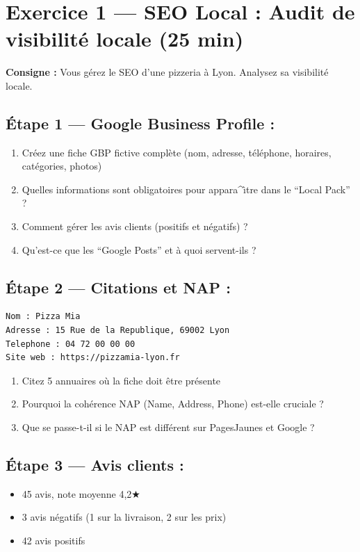 \documentclass[12pt,a4paper]{report}
\begin{document}
\section{Exercice 1 --- SEO Local : Audit de visibilit\'{e} locale (25 min)}

\textbf{Consigne :} Vous g\'{e}rez le SEO d'une pizzeria \`{a} Lyon. Analysez sa visibilit\'{e} locale.

\subsection*{\'{E}tape 1 --- Google Business Profile :}
\begin{enumerate}
    \item Cr\'{e}ez une fiche GBP fictive compl\`{e}te (nom, adresse, t\'{e}l\'{e}phone, horaires, cat\'{e}gories, photos)
    \item Quelles informations sont obligatoires pour appara^{\^\i}tre dans le ``Local Pack'' ?
    \item Comment g\'{e}rer les avis clients (positifs et n\'{e}gatifs) ?
    \item Qu'est-ce que les ``Google Posts'' et \`{a} quoi servent-ils ?
\end{enumerate}

\subsection*{\'{E}tape 2 --- Citations et NAP :}
\begin{lstlisting}
Nom : Pizza Mia
Adresse : 15 Rue de la Republique, 69002 Lyon
Telephone : 04 72 00 00 00
Site web : https://pizzamia-lyon.fr
\end{lstlisting}

\begin{enumerate}
    \item Citez 5 annuaires o\`{u} la fiche doit \^{e}tre pr\'{e}sente
    \item Pourquoi la coh\'{e}rence NAP (Name, Address, Phone) est-elle cruciale ?
    \item Que se passe-t-il si le NAP est diff\'{e}rent sur PagesJaunes et Google ?
\end{enumerate}

\subsection*{\'{E}tape 3 --- Avis clients :}
\begin{itemize}
    \item 45 avis, note moyenne 4,2$\bigstar$
    \item 3 avis n\'{e}gatifs (1 sur la livraison, 2 sur les prix)
    \item 42 avis positifs
\end{itemize}
\end{document}
